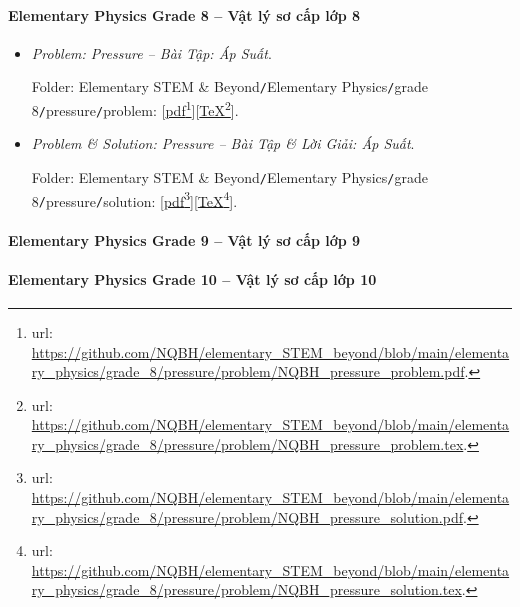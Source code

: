 \documentclass[12pt]{article}
\begin{document}
\paragraph{Elementary Physics Grade 8 -- Vật lý sơ cấp lớp 8}

\begin{itemize}
	\item {\it Problem: Pressure -- Bài Tập: Áp Suất}.
	
	Folder: {\sf Elementary STEM \& Beyond{\tt/}Elementary Physics{\tt/}grade 8{\tt/}pressure{\tt/}problem}: [\href{https://github.com/NQBH/elementary_STEM_beyond/blob/main/elementary_physics/grade_8/pressure/problem/NQBH_pressure_problem.pdf}{pdf}\footnote{{\sc url}: \url{https://github.com/NQBH/elementary_STEM_beyond/blob/main/elementary_physics/grade_8/pressure/problem/NQBH_pressure_problem.pdf}.}][\href{https://github.com/NQBH/elementary_STEM_beyond/blob/main/elementary_physics/grade_8/pressure/problem/NQBH_pressure_problem.tex}{\TeX}\footnote{{\sc url}: \url{https://github.com/NQBH/elementary_STEM_beyond/blob/main/elementary_physics/grade_8/pressure/problem/NQBH_pressure_problem.tex}.}].
	\item {\it Problem \& Solution: Pressure -- Bài Tập \& Lời Giải: Áp Suất}.
	
	Folder: {\sf Elementary STEM \& Beyond{\tt/}Elementary Physics{\tt/}grade 8{\tt/}pressure{\tt/}solution}: [\href{https://github.com/NQBH/elementary_STEM_beyond/blob/main/elementary_physics/grade_8/pressure/problem/NQBH_pressure_solution.pdf}{pdf}\footnote{{\sc url}: \url{https://github.com/NQBH/elementary_STEM_beyond/blob/main/elementary_physics/grade_8/pressure/problem/NQBH_pressure_solution.pdf}.}][\href{https://github.com/NQBH/elementary_STEM_beyond/blob/main/elementary_physics/grade_8/pressure/problem/NQBH_pressure_solution.tex}{\TeX}\footnote{{\sc url}: \url{https://github.com/NQBH/elementary_STEM_beyond/blob/main/elementary_physics/grade_8/pressure/problem/NQBH_pressure_solution.tex}.}].
\end{itemize}

\paragraph{Elementary Physics Grade 9 -- Vật lý sơ cấp lớp 9}

\paragraph{Elementary Physics Grade 10 -- Vật lý sơ cấp lớp 10}
\end{document}
